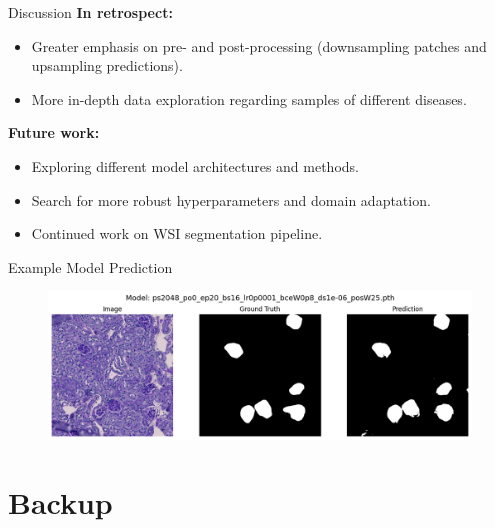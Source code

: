 \documentclass{beamer}
\begin{document}
\begin{frame}{Discussion}
    \textbf{In retrospect:}
    \begin{itemize}
        \item Greater emphasis on pre- and post-processing (downsampling patches and upsampling predictions).
        \item More in-depth data exploration regarding samples of different diseases.
    \end{itemize}

    \vspace{0.5cm}

    \textbf{Future work:}
    \begin{itemize}
        \item Exploring different model architectures and methods.
        \item Search for more robust hyperparameters and domain adaptation.
        \item Continued work on WSI segmentation pipeline.
    \end{itemize}
\end{frame}

\begin{frame}{Example Model Prediction}
    \begin{figure}
        \centering
        \includegraphics[width=\textwidth]{Images/big_good.png}
    \end{figure}
\end{frame}

\appendix

\section{Backup}
\end{document}
